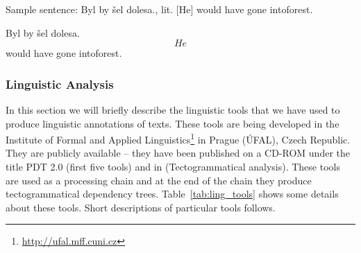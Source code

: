 Sample sentence: Byl by šel dolesa., lit. [He] would have gone intoforest.

Byl by šel dolesa.
\\\[He\] would have gone intoforest.




\subsubsection{Linguistic Analysis}

In this section we will briefly describe the linguistic tools that we have used to produce linguistic annotations of texts. These tools are being developed in the Institute of Formal and Applied Linguistics\footnote{\url{http://ufal.mff.cuni.cz}} in Prague (ÚFAL), Czech Republic. They are publicly available -- they have been published on a CD-ROM under the title PDT 2.0 \citep{biblio:PDT20_CD} (first five tools) and in \citep{biblio:KlTransformationBasedTectogrammatical2006} (Tectogrammatical analysis). These tools are used as a processing chain and at the end of the chain they produce tectogrammatical \citep{biblio:MiBeAnnotationtectogrammatical2006} dependency trees. Table~\ref{tab:ling_tools} shows some details about these tools. Short descriptions of particular tools follows.



